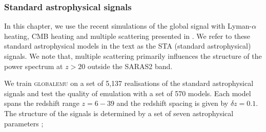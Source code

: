 \subsubsection{Standard astrophysical signals}

In this chapter, we use the recent simulations of the global signal with Lyman-$\alpha$ heating, CMB heating and multiple scattering presented in \cite{Reis_sta_2021}. We refer to these standard astrophysical models in the text as the STA (standard astrophysical) signals. %
We note that, multiple scattering primarily influences the structure of the power spectrum at $z > 20$ \citep{Reis_sta_2021} outside the SARAS2 band.

We train \textsc{globalemu} on a set of 5,137 realisations of the standard astrophysical signals and test the quality of emulation with a set of 570 models. Each model spans the redshift range $z = 6 - 39$ and the redshift spacing is given by $\delta z = 0.1$. The structure of the signals is determined by a set of seven astrophysical parameters \citep[further details can be found in the introduction of the thesis and ][]{Cohen2020, Reis_sta_2021, Bevins_globalemu_2021};


